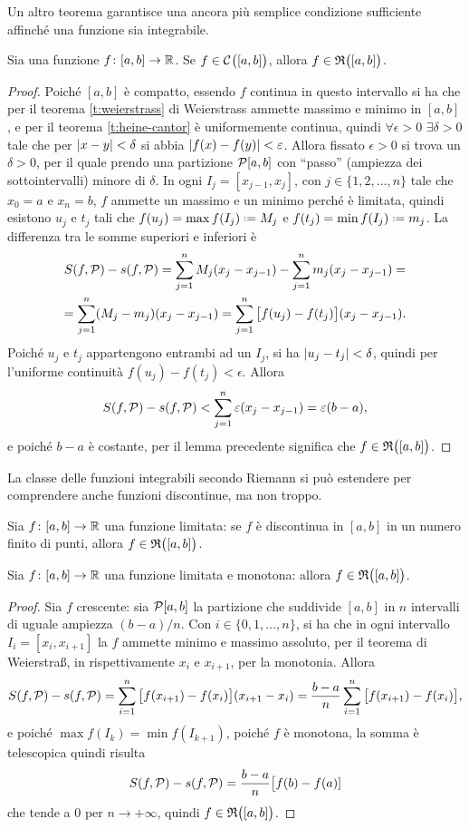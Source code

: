 Un altro teorema garantisce una ancora più semplice condizione sufficiente affinché una funzione sia integrabile.
\begin{teorema} \label{t:continua-integrabile}
Sia una funzione $f\colon[a,b]\to\mathbb{R}$. Se $f\in\mathcal{C}^{{}}\big([a,b]\big)$, allora $f\in\mathfrak{R}\big([a,b]\big)$.
\end{teorema}
\begin{proof}
Poiché $[a,b]$ è compatto, essendo $f$ continua in questo intervallo si ha che per il teorema \ref{t:weierstrass} di Weierstrass ammette massimo e minimo in $[a,b]$, e per il teorema \ref{t:heine-cantor} è uniformemente continua, quindi $\forall\epsilon>0$ $\exists\delta>0$ tale che per $\left|{x-y}\right|<\delta$ si abbia $\left|{f(x)-f(y)}\right|<\varepsilon$.
Allora fissato $\epsilon>0$ si trova un $\delta>0$, per il quale prendo una partizione $\mathcal{P}[a,b]$ con ``passo'' (ampiezza dei sottointervalli) minore di $\delta$. In ogni $I_j=[x_{j-1},x_j]$, con $j\in\{1,2,\dots,n\}$ tale che $x_0=a$ e $x_n=b$, $f$ ammette un massimo e un minimo perché è limitata, quindi esistono $u_j$ e $t_j$ tali che $f(u_j)=\max f(I_j)\defeq M_j$ e $f(t_j)=\min f(I_j)\defeq m_j$. La differenza tra le somme superiori e inferiori è
\begin{multline}
S(f,\mathcal{P})-s(f,\mathcal{P})=\sum_{j=1}^nM_j(x_j-x_{j-1})-\sum_{j=1}^nm_j(x_j-x_{j-1})=\\
=\sum_{j=1}^n(M_j-m_j)(x_j-x_{j-1})=\sum_{j=1}^n\big[f(u_j)-f(t_j)\big](x_j-x_{j-1}).
\end{multline}
Poiché $u_j$ e $t_j$ appartengono entrambi ad un $I_j$, si ha $\left|{u_j-t_j}\right|<\delta$, quindi per l'uniforme continuità $f(u_j)-f(t_j)<\epsilon$. Allora
\[
S(f,\mathcal{P})-s(f,\mathcal{P})<\sum_{j=1}^n\varepsilon(x_j-x_{j-1})=\varepsilon(b-a),
\]
e poiché $b-a$ è costante, per il lemma precedente significa che $f\in\mathfrak{R}\big([a,b]\big)$.
\end{proof}
La classe delle funzioni integrabili secondo Riemann si può estendere per comprendere anche funzioni discontinue, ma non troppo.
\begin{osservazione}
Sia $f\colon[a,b]\to\mathbb{R}$ una funzione limitata: se $f$ è discontinua in $[a,b]$ in un numero finito di punti, allora $f\in\mathfrak{R}\big([a,b]\big)$.
\end{osservazione}
\begin{teorema}
Sia $f\colon[a,b]\to\mathbb{R}$ una funzione limitata e monotona: allora $f\in\mathfrak{R}\big([a,b]\big)$.
\end{teorema}
\begin{proof}
Sia $f$ crescente: sia $\mathcal{P}[a,b]$ la partizione che suddivide $[a,b]$ in $n$ intervalli di uguale ampiezza $(b-a)/n$. Con $i\in\{0,1,\dots,n\}$, si ha che in ogni intervallo $I_i=[x_i,x_{i+1}]$ la $f$ ammette minimo e massimo assoluto, per il teorema di Weierstra\ss, in rispettivamente $x_i$ e $x_{i+1}$, per la monotonia. Allora
\[
S(f,\mathcal{P})-s(f,\mathcal{P})=\sum_{i=1}^n\big[f(x_{i+1})-f(x_i)\big](x_{i+1}-x_i)=\frac{b-a}{n}\sum_{i=1}^n\big[f(x_{i+1})-f(x_i)\big],
\]
e poiché $\max f(I_k)=\min f(I_{k+1})$, poiché $f$ è monotona, la somma è telescopica quindi risulta
\[
S(f,\mathcal{P})-s(f,\mathcal{P})=\frac{b-a}{n}\big[f(b)-f(a)]
\]
che tende a 0 per $n\to+\infty$, quindi $f\in\mathfrak{R}\big([a,b]\big)$.
\end{proof}


